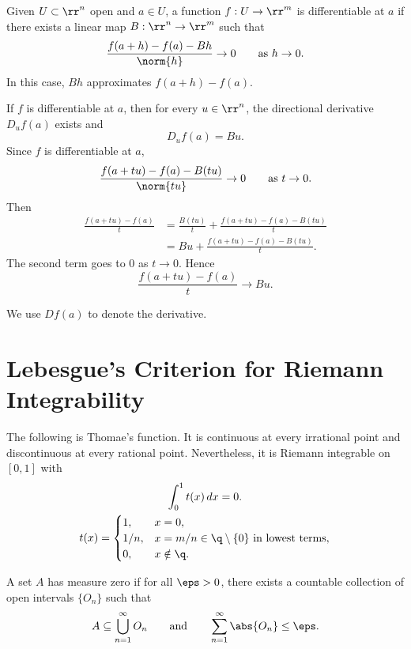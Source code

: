 \begin{definition}[Differentiability]
	Given $U\subset\rr^n$ open and $a\in U$, a function $f:U\to\rr^m$ is differentiable at $a$ if there exists a linear map $B:\rr^n\to\rr^m$ such that
	\[
		\frac{f(a+h) - f(a) - Bh}{\norm{h}}\to 0
		\qquad\text{as } h\to 0.
	\]
	In this case, $Bh$ approximates $f(a+h)-f(a)$.
\end{definition}

\begin{theorem}{
	If $f$ is differentiable at $a$, then for every $u\in\rr^n$, the directional derivative $D_u f(a)$ exists and
	\[
		D_u f(a) = Bu.
	\]
}
	Since $f$ is differentiable at $a$,
	\[
		\frac{f(a+tu) - f(a) - B(tu)}{\norm{tu}}\to 0
		\qquad\text{as } t\to 0.
	\]
	Then
	\begin{align*}
		\frac{f(a+tu) - f(a)}{t}
		&= \frac{B(tu)}{t} + \frac{f(a+tu) - f(a) - B(tu)}{t}\\
		&= Bu + \frac{f(a+tu) - f(a) - B(tu)}{t}.
	\end{align*}
	The second term goes to $0$ as $t\to 0$.
	Hence
	\[
		\frac{f(a+tu) - f(a)}{t}\to Bu.
	\]
\end{theorem}

\begin{remark}
	We use $Df(a)$ to denote the derivative.
\end{remark}

\section{Lebesgue's Criterion for Riemann Integrability}

\begin{observation}
	The following is Thomae's function.
	It is continuous at every irrational point and discontinuous at every rational point.
	Nevertheless, it is Riemann integrable on $[0,1]$ with
	\begin{gather*}
	    \int_0^1 t(x)\,dx = 0.\\
	    t(x) =
		\begin{cases}
			1, & x=0,\\
			1/n, & x=m/n\in\q\setminus\{0\}\text{ in lowest terms},\\
			0, & x\notin\q.
		\end{cases}\\
	\end{gather*}
\end{observation}

\begin{definition}
	A set $A$ has measure zero if for all $\eps > 0$, there exists a countable collection of open intervals $\{O_n\}$ such that
	\[
		A\subseteq\bigcup_{n=1}^\infty O_n
		\qquad\text{and}\qquad
		\sum_{n=1}^\infty\abs{O_n}\leq\eps.
	\]
\end{definition}

